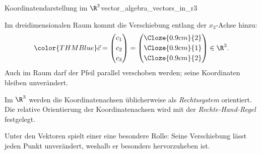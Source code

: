 \begin{ExampleBox}{Koordinatendarstellung im $\R^3$}{vector_algebra_vectors_in_r3}
  \noindent
  \begin{minipage}[c]{0.40\linewidth}
    Im dreidimensionalen Raum kommt die Verschiebung entlang der
    $x_3$-Achse hinzu:
    \[
      {\color{THMBlue}
        \vec c=
        \begin{pmatrix}
          c_1\\[0.25em]c_2\\[0.25em]c_3
        \end{pmatrix}
        =
        \begin{pmatrix}
          \Cloze{0.9cm}{2}\\[0.25em]
          \Cloze{0.9cm}{1}\\[0.25em]
          \Cloze{0.9cm}{2}
        \end{pmatrix}}
      \in\R^3.
    \]
    Auch im Raum darf der Pfeil parallel verschoben werden; seine
    Koordinaten bleiben unverändert.
  \end{minipage}\hfill
  \begin{minipage}[c]{0.56\linewidth}
    \centering
  \end{minipage}
\end{ExampleBox}

\begin{RemarkBox}[title=Rechtssystem]
  \label{rem:vector_algebra_right_handed_system}
  Im $\R^3$ werden die Koordinatenachsen üblicherweise als
  \emph{Rechtssystem} 
  orientiert. Die relative Orientierung der Koordinatenachsen wird mit der
  \emph{Rechte-Hand-Regel}  festgelegt.
  \par\smallskip
  \noindent
  \begin{minipage}[c]{0.44\linewidth}
    \centering
  \end{minipage}\hfill
  \begin{minipage}[c]{0.50\linewidth}
    \centering
  \end{minipage}
\end{RemarkBox}

Unter den Vektoren spielt einer eine besondere Rolle: Seine Verschiebung lässt
jeden Punkt unverändert, weshalb er besonders hervorzuheben ist.


